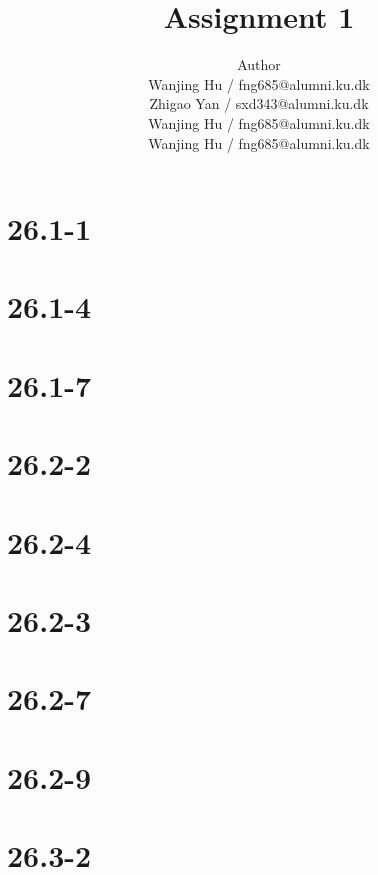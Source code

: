 \documentclass[11pt]{article}
\title{Assignment 1}
\author{Author \\
  Wanjing Hu / fng685@alumni.ku.dk  \\
  Zhigao Yan / sxd343@alumni.ku.dk  \\
  Wanjing Hu / fng685@alumni.ku.dk  \\
  Wanjing Hu / fng685@alumni.ku.dk  \\
}
\begin{document}
\maketitle


\section{26.1-1}
 
 \section{26.1-4}
\section{26.1-7}
\section{26.2-2}
\section{26.2-4}
\section{26.2-3}
\section{26.2-7}
\section{26.2-9}
\section{26.3-2}
\end{document}
